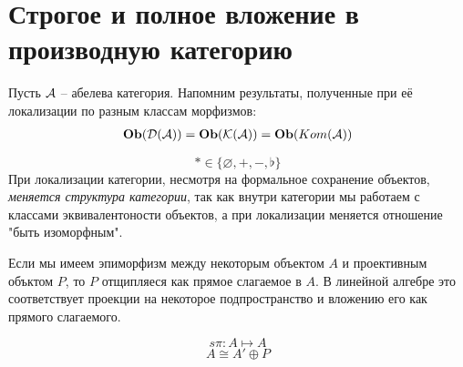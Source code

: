 \documentclass[../main.tex]{subfiles}
\begin{document}
\section{Строгое и полное вложение в производную категорию}
Пусть $\mathcal{A}$ -- абелева категория. Напомним результаты, полученные при её локализации по разным классам морфизмов:
\begin{align*}
    \mathbf{Ob}(\mathcal{D(A)}) = \mathbf{Ob}(\mathcal{K(A)}) = \mathbf{Ob}( Kom(\mathcal{A}))
\end{align*}
\bee
{}
\eee
\[
* \in \lbrace \varnothing, +, -, \flat\rbrace
\]
При локализации категории, несмотря на формальное сохранение объектов, \textit{меняется структура категории}, так как внутри категории мы работаем с классами эквивалентоности объектов, а при локализации меняется отношение "быть изоморфным". 
\begin{to_com}
Если мы имеем эпиморфизм между некоторым объектом $A$ и проективным объктом $P$, то $P$ отщипляеся как прямое слагаемое в $A$. В линейной алгебре это соответствует проекции на некоторое подпространство и вложению его как прямого слагаемого.
    \bee
    \eee
    \[
    s\pi \colon A \mapsto A
    \]
    \[
    A \cong A' \oplus P
    \]
\end{to_com}
\end{document}

